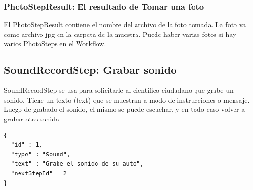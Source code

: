 \subsubsection{PhotoStepResult: El resultado de Tomar una foto}
El PhotoStepResult contiene el nombre del archivo de la foto tomada. La foto va como archivo jpg en la carpeta de la muestra.
Puede haber varias fotos si hay varios PhotoSteps en el Workflow.




\subsection{SoundRecordStep: Grabar sonido}
SoundRecordStep  se usa para solicitarle al científico ciudadano que grabe un sonido. Tiene un texto (text) que se muestran a modo de instrucciones o mensaje. Luego de grabado el sonido, el mismo se puede escuchar, y en todo caso volver a grabar otro sonido.

\begin{lstlisting}[language=XML, frame=tlbr, caption=SoundRecordStep usando el generador de clases.]	
{
  "id" : 1,
  "type" : "Sound",
  "text" : "Grabe el sonido de su auto",
  "nextStepId" : 2
}
\end{lstlisting}

